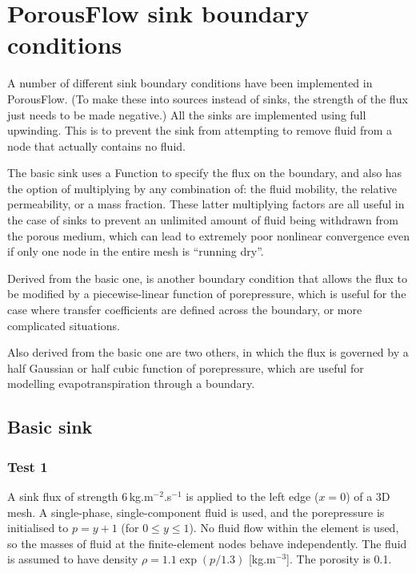 \chapter{PorousFlow sink boundary conditions}

A number of different sink boundary conditions have been implemented
in PorousFlow.  (To make these into sources instead of sinks, the
strength of the flux just needs to be made negative.)  All the sinks
are implemented using full upwinding.  This is to prevent the sink
from attempting to remove fluid from a node that actually contains no
fluid.

The basic sink uses a Function to specify the flux on the boundary,
and also has the option of multiplying by any combination of: the
fluid mobility, the relative permeability, or a mass fraction.  These
latter multiplying factors are all useful in the case of sinks to
prevent an unlimited amount of fluid being withdrawn from the porous
medium, which can lead to extremely poor nonlinear convergence even if
only one node in the entire mesh is ``running dry''.

Derived from the basic one, is another boundary condition that allows
the flux to be modified by a piecewise-linear function of
porepressure, which is useful for the case where transfer coefficients
are defined across the boundary, or more complicated situations.

Also derived from the basic one are two others, in which the flux is
governed by a half Gaussian or half cubic function of porepressure,
which are useful for modelling evapotranspiration through a boundary.

\section{Basic sink}
\label{basic.sec}

\subsection{Test 1}

A sink flux of strength 6\,kg.m$^{-2}$.s$^{-1}$ is applied to the left
edge ($x=0$) of a 3D mesh.  A single-phase, single-component fluid is
used, and the porepressure is initialised to $p=y+1$ (for $0\leq y\leq
1$).  No fluid flow within the element is used, so the masses of fluid
at the finite-element nodes behave independently.  The fluid is
assumed to have density $\rho = 1.1 \exp(p/1.3)$ [kg.m$^{-3}$].  The
porosity is 0.1.

